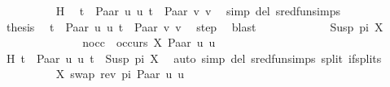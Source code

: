 \begin{isabellebody}
\ \ \ \ \ \ \ \ \isamarkupfalse%
\ H\ \isamarkupfalse%
\ {\isacartoucheopen}t{}\ {\isacharequal}{\kern0pt}\ Paar\ u{}\ u{}{\isacartoucheclose}\ {\isacartoucheopen}t{}\ {\isacharequal}{\kern0pt}\ Paar\ v{}\ v{}{\isacartoucheclose}\ \isamarkupfalse%
\ {\isacharparenleft}{\kern0pt}simp\ del{\isacharcolon}{\kern0pt}\ sred{\isacharunderscore}{\kern0pt}fun{\isachardot}{\kern0pt}simps{\isacharparenright}{\kern0pt}\isanewline
\ \ \ \ \ \ \isamarkupfalse%
\ \isamarkupfalse%
\ {\isacharquery}{\kern0pt}thesis\ \isamarkupfalse%
\ {\isacartoucheopen}t{}\ {\isacharequal}{\kern0pt}\ Paar\ u{}\ u{}{\isacartoucheclose}\ {\isacartoucheopen}t{}\ {\isacharequal}{\kern0pt}\ Paar\ v{}\ v{}{\isacartoucheclose}\ \isamarkupfalse%
\ step\ \isamarkupfalse%
\ blast\isanewline
\ \ \ \ \isamarkupfalse%
\isanewline
\ \ \ \ \ \ \isamarkupfalse%
\ {\isacharparenleft}{\kern0pt}Susp\ pi\ X{\isacharparenright}{\kern0pt}\isanewline
\ \ \ \ \ \ %
\isanewline
\ \ \ \ \ \ \isamarkupfalse%
\ nocc{\isacharcolon}{\kern0pt}\ {\isachardoublequoteopen}{\isasymnot}\ occurs\ X\ {\isacharparenleft}{\kern0pt}Paar\ u{}\ u{}{\isacharparenright}{\kern0pt}{\isachardoublequoteclose}\isanewline
\ \ \ \ \ \ \ \ \isamarkupfalse%
\ H\ {\isacartoucheopen}t{}\ {\isacharequal}{\kern0pt}\ Paar\ u{}\ u{}{\isacartoucheclose}\ {\isacartoucheopen}t{}\ {\isacharequal}{\kern0pt}\ Susp\ pi\ X{\isacartoucheclose}\ \isamarkupfalse%
\ {\isacharparenleft}{\kern0pt}auto\ simp\ del{\isacharcolon}{\kern0pt}\ sred{\isacharunderscore}{\kern0pt}fun{\isachardot}{\kern0pt}simps\ split{\isacharcolon}{\kern0pt}\ if{\isacharunderscore}{\kern0pt}splits{\isacharparenright}{\kern0pt}\isanewline
\ \ \ \ \ \ \isamarkupfalse%
\ {\isacharquery}{\kern0pt}{\isasymsigma}\ {\isacharequal}{\kern0pt}\ {\isachardoublequoteopen}{\isacharbrackleft}{\kern0pt}{\isacharparenleft}{\kern0pt}X{\isacharcomma}{\kern0pt}\ swap\ {\isacharparenleft}{\kern0pt}rev\ pi{\isacharparenright}{\kern0pt}\ {\isacharparenleft}{\kern0pt}Paar\ u{}\ u{}{\isacharparenright}{\kern0pt}{\isacharparenright}{\kern0pt}{\isacharbrackright}{\kern0pt}{\isachardoublequoteclose}\isanewline

\end{isabellebody}
